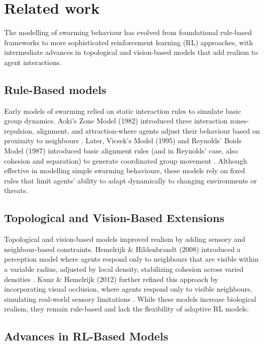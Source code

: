 \documentclass[9pt]{pnas-new}
\begin{document}
\section*{Related work}
The modelling of swarming behaviour has evolved from foundational rule-based frameworks to more sophisticated reinforcement learning (RL) approaches, with intermediate advances in topological and vision-based models that add realism to agent interactions.

\subsection{Rule-Based models}
Early models of swarming relied on static interaction rules to simulate basic group dynamics. 
Aoki's Zone Model (1982) introduced three interaction zones-repulsion, alignment, and attraction-where agents adjust their behaviour based on proximity to neighbours \cite{aoki1987zones}. 
Later, Vicsek's Model (1995) and Reynolds' Boids Model (1987) introduced basic alignment rules (and in Reynolds' case, also cohesion and separation) to generate coordinated group movement \cite{Vicsek1995}\cite{reynolds1987boids}. 
Although effective in modelling simple swarming behaviours, these models rely on fixed rules that limit agents' ability to adapt dynamically to changing environments or threats.

\subsection{Topological and Vision-Based Extensions}

Topological and vision-based models improved realism by adding sensory and neighbour-based constraints. 
Hemelrijk \& Hildenbrandt (2008) introduced a perception model where agents respond only to neighbours that are visible within a variable radius, adjusted by local density, stabilizing cohesion across varied densities \cite{Hemelrijk2008}. 
Kunz \& Hemelrijk (2012) further refined this approach by incorporating visual occlusion, where agents respond only to visible neighbours, simulating real-world sensory limitations \cite{kunz2012}. While these models increase biological realism, they remain rule-based and lack the flexibility of adaptive RL models.

\subsection{Advances in RL-Based Models}
\end{document}
